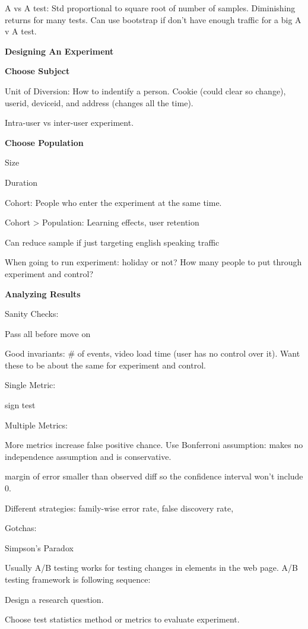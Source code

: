 \documentclass[]{book}
\theoremstyle{definition}
\theoremstyle{definition}
\theoremstyle{definition}
\theoremstyle{remark}
\begin{document}
A vs A test: Std proportional to square root of number of samples.
Diminishing returns for many tests. Can use bootstrap if don't have
enough traffic for a big A v A test.

\textbf{Designing An Experiment}

\textbf{Choose Subject}

Unit of Diversion: How to indentify a person. Cookie (could clear so
change), userid, deviceid, and address (changes all the time).

Intra-user vs inter-user experiment.

\textbf{Choose Population}

Size

Duration

Cohort: People who enter the experiment at the same time.

Cohort \textgreater{} Population: Learning effects, user retention

Can reduce sample if just targeting english speaking traffic

When going to run experiment: holiday or not? How many people to put
through experiment and control?

\textbf{Analyzing Results}

Sanity Checks:

Pass all before move on

Good invariants: \# of events, video load time (user has no control over
it). Want these to be about the same for experiment and control.

Single Metric:

sign test

Multiple Metrics:

More metrics increase false positive chance. Use Bonferroni assumption:
makes no independence assumption and is conservative.

margin of error smaller than observed diff so the confidence interval
won't include 0.

Different strategies: family-wise error rate, false discovery rate,

Gotchas:

Simpson's Paradox

Usually A/B testing works for testing changes in elements in the web
page. A/B testing framework is following sequence:

Design a research question.

Choose test statistics method or metrics to evaluate experiment.
\end{document}
